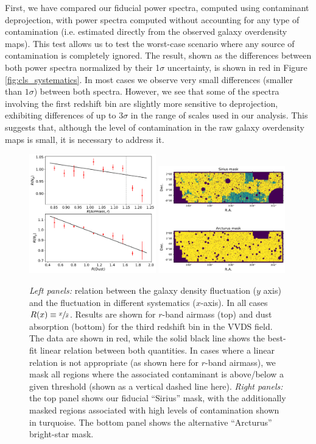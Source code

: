 \documentclass[a4paper,11pt]{article}
\begin{document}
      First, we have compared our fiducial power spectra, computed using contaminant deprojection, with power spectra computed without accounting for any type of contamination (i.e. estimated directly from the observed galaxy overdensity maps). This test allows us to test the worst-case scenario where any source of contamination is completely ignored. The result, shown as the differences between both power spectra normalized by their 1$\sigma$ uncertainty, is shown in red in Figure \ref{fig:cls_systematics}. In most cases we observe very small differences (smaller than $1\sigma$) between both spectra. However, we see that some of the spectra involving the first redshift bin are slightly more sensitive to deprojection, exhibiting differences of up to 3$\sigma$ in the range of scales used in our analysis. This suggests that, although the level of contamination in the raw galaxy overdensity maps is small, it is necessary to address it.
      \begin{figure}
        \centering
        \includegraphics[width=0.49\textwidth]{figures/ndens_syst.pdf}
        \includegraphics[width=0.49\textwidth]{figures/systmask.pdf}
        \caption{{\sl Left panels:} relation between the galaxy density fluctuation ($y$ axis) and the fluctuation in different systematics ($x$-axis). In all cases $R(x)\equiv \sfrac{x}{\bar{x}}$. Results are shown for $r$-band airmass (top) and dust absorption (bottom) for the third redshift bin in the VVDS field. The data are shown in red, while the solid black line shows the best-fit linear relation between both quantities. In cases where a linear relation is not appropriate (as shown here for $r$-band airmass), we mask all regions where the associated contaminant is above/below a given threshold (shown as a vertical dashed line here). {\sl Right panels:} the top panel shows our fiducial ``Sirius'' mask, with the additionally masked regions associated with high levels of contamination shown in turquoise. The bottom panel shows the alternative ``Arcturus'' bright-star mask.}
        \label{fig:ndens_syst}
      \end{figure}
      
\end{document}
